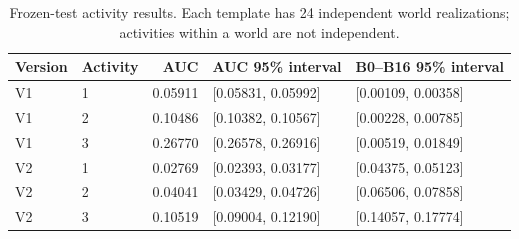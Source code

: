 \begin{table}[tbp]
\centering\small
\setlength{\tabcolsep}{4pt}
\caption{Frozen-test activity results. Each template has 24 independent world realizations; activities within a world are not independent.}\label{tab:v2-activities}
\begin{tabular}{llrll}
\toprule
Version & Activity & AUC & AUC 95\% interval & B0--B16 95\% interval \\
\midrule
V1 & 1 & 0.05911 & [0.05831, 0.05992] & [0.00109, 0.00358] \\
V1 & 2 & 0.10486 & [0.10382, 0.10567] & [0.00228, 0.00785] \\
V1 & 3 & 0.26770 & [0.26578, 0.26916] & [0.00519, 0.01849] \\
V2 & 1 & 0.02769 & [0.02393, 0.03177] & [0.04375, 0.05123] \\
V2 & 2 & 0.04041 & [0.03429, 0.04726] & [0.06506, 0.07858] \\
V2 & 3 & 0.10519 & [0.09004, 0.12190] & [0.14057, 0.17774] \\
\bottomrule
\end{tabular}
\end{table}

